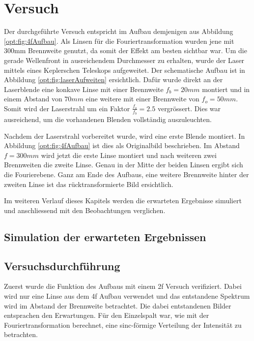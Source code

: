 %
%
%
%
\section{Versuch
\label{opt:section:versuch}}

Der durchgeführte Versuch entspricht im Aufbau demjenigen aus Abbildung \ref{opt:fig:4fAufbau}.
Als Linsen für die Fouriertransformation wurden jene mit 300mm Brennweite genutzt, da somit der Effekt am besten sichtbar war.
Um die gerade Wellenfront in ausreichendem Durchmesser zu erhalten, wurde der Laser mittels eines Keplerschen Teleskops aufgeweitet.
Der schematische Aufbau ist in Abbildung \ref{opt:fig:laserAufweiten} ersichtlich.
Dafür wurde direkt an der Laserblende eine konkave Linse mit einer Brennweite $f_b = 20mm$ montiert und in einem Abstand von $70mm$ eine weitere mit einer Brennweite von $f_o = 50mm$.
Somit wird der Laserstrahl um ein Faktor $\frac{f_o}{f_b} = 2.5$ vergrössert.
Dies war ausreichend, um die vorhandenen Blenden vollständig auszuleuchten.

Nachdem der Laserstrahl vorbereitet wurde, wird eine erste Blende montiert.
In Abbildung \ref{opt:fig:4fAufbau} ist dies als Originalbild beschrieben.
Im Abstand $f=300mm$ wird jetzt die erste Linse montiert und nach weiteren zwei Brennweiten die zweite Linse.
Genau in der Mitte der beiden Linsen ergibt sich die Fourierebene.
Ganz am Ende des Aufbaus, eine weitere Brennweite hinter der zweiten Linse ist das rücktransformierte Bild ersichtlich.

Im weiteren Verlauf dieses Kapitels werden die erwarteten Ergebnisse simuliert und anschliessend mit den Beobachtungen verglichen.
\subsection{Simulation der erwarteten Ergebnissen}

\subsection{Versuchsdurchführung}
Zuerst wurde die Funktion des Aufbaus mit einem 2f Versuch verifiziert.
Dabei wird nur eine Linse aus dem 4f Aufbau verwendet und das entstandene Spektrum wird im Abstand der Brennweite betrachtet.
Die dabei entstandenen Bilder entsprachen den Erwartungen.
Für den Einzelspalt war, wie mit der Fouriertransformation berechnet, eine sinc-förmige Verteilung der Intensität zu betrachten.

